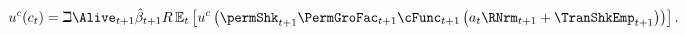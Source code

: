   \begin{equation}\begin{gathered}\begin{aligned}
        \uFunc^{{c}}({c}_{\prd}) & = \beth\Alive_{\prd+1}\hat{\DiscFac}_{\prd+1}\Rfree \Ex_{\prd}\left[\uFunc^{{c}}\left(\permShk_{\prd+1}\PermGroFac_{\prd+1}\cFunc_{\prd+1}\left({a}_{\prd}\RNrm_{\prd+1}+\TranShkEmp_{\prd+1}\right)\right)\right]\label{eq:FOCLifeCycle}
        .
      \end{aligned}\end{gathered}\end{equation}
